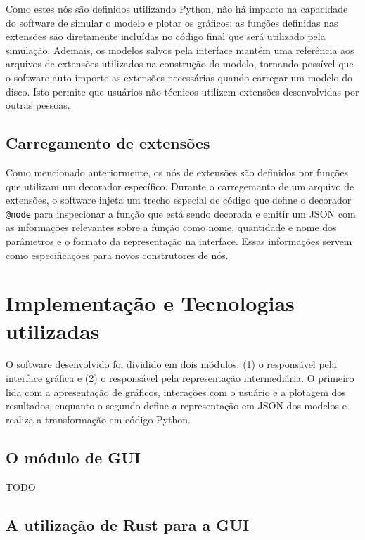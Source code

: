 \documentclass[
	12pt,				%
	openright,			%
	oneside,			%
	a4paper,			%
	main=brazil,
	english,			%
	]{ufsj-abntex2}
\begin{document}
Como estes nós são definidos utilizando Python, não há impacto na capacidade do software de simular o modelo e plotar os gráficos; as funções definidas nas extensões são diretamente incluídas no código final que será utilizado pela simulação. Ademais, os modelos salvos pela interface mantém uma referência aos arquivos de extensões utilizados na construção do modelo, tornando possível que o software auto-importe as extensões necessárias quando carregar um modelo do disco. Isto permite que usuários não-técnicos utilizem extensões desenvolvidas por outras pessoas.

\subsection{Carregamento de extensões}

Como mencionado anteriormente, os nós de extensões são definidos por funções que utilizam um decorador específico. Durante o carregemanto de um arquivo de extensões, o software injeta um trecho especial de código que define o decorador \texttt{@node} para inspecionar a função que está sendo decorada e emitir um JSON com as informações relevantes sobre a função como nome, quantidade e nome dos parâmetros e o formato da representação na interface. Essas informações servem como especificações para novos construtores de nós.

\section{Implementação e Tecnologias utilizadas}
\label{sec:tecnologias}

O software desenvolvido foi dividido em dois módulos: (1) o responsável pela interface gráfica e (2) o responsável pela representação intermediária. O primeiro lida com a apresentação de gráficos, interações com o usuário e a plotagem dos resultados, enquanto o segundo define a representação em JSON dos modelos e realiza a transformação em código Python.

\subsection{O módulo de GUI}
\label{sub:gui}

TODO

\subsection{A utilização de Rust para a GUI}
\label{sub:cpp-rust}
\end{document}
